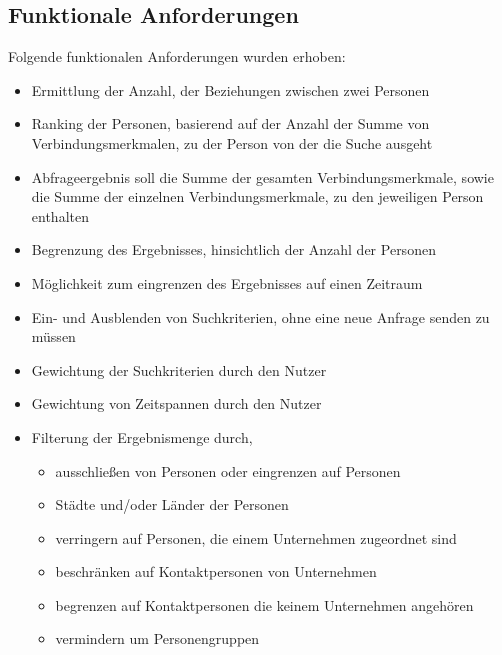\subsection{Funktionale Anforderungen}

Folgende funktionalen Anforderungen wurden erhoben:

\begin{itemize}
\item Ermittlung der Anzahl, der Beziehungen zwischen zwei Personen

\item Ranking der Personen, basierend auf der Anzahl der Summe von Verbindungsmerkmalen, zu der Person von der die Suche ausgeht

\item Abfrageergebnis soll die Summe der gesamten Verbindungsmerkmale, sowie die Summe der einzelnen Verbindungsmerkmale, zu den jeweiligen Person enthalten

\item Begrenzung des Ergebnisses, hinsichtlich der Anzahl der Personen

\item Möglichkeit zum eingrenzen des Ergebnisses auf einen Zeitraum

\item Ein- und Ausblenden von Suchkriterien, ohne eine neue Anfrage senden zu müssen

\item Gewichtung der Suchkriterien durch den Nutzer

\item Gewichtung von Zeitspannen durch den Nutzer

\item Filterung der Ergebnismenge durch,	
	\begin{itemize}
	\item ausschließen von Personen oder eingrenzen auf Personen
	\item Städte und/oder Länder der Personen
	\item verringern auf Personen, die einem Unternehmen zugeordnet sind 
	\item beschränken auf Kontaktpersonen von Unternehmen
	\item begrenzen auf Kontaktpersonen die keinem Unternehmen angehören
	\item vermindern um Personengruppen
	\end{itemize}
\end{itemize}

